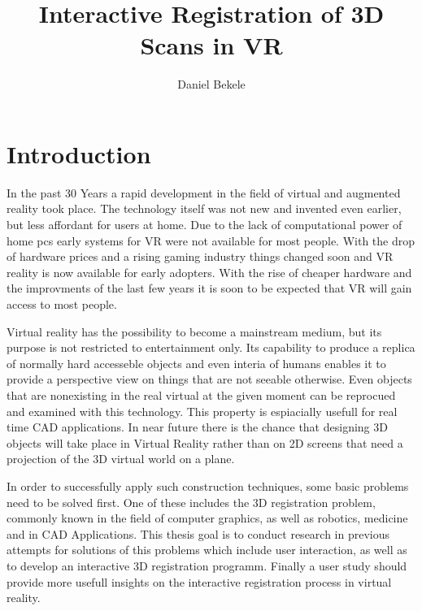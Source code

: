 \documentclass[hyperref,english,bachelorofscience,bibnum]{cgvpub}
\author{Daniel Bekele}
\title{Interactive Registration of 3D Scans in VR}
\begin{document}
\chapter{Introduction}
In the past 30 Years a rapid development in the field of  virtual and augmented reality took place. The technology itself was not new and invented even earlier, but less affordant for users at home. Due to the lack of computational power of home pcs early systems for VR were not available for most people. With the drop of hardware prices and a rising gaming industry things changed soon and VR reality is now available for early adopters. With the rise of cheaper hardware and the improvments of the last few years it is soon to be expected that VR will gain access to most people.

Virtual reality has the possibility to become a mainstream medium, but its purpose is not restricted to entertainment only. Its capability to produce a replica of normally hard accesseble objects and even interia of humans enables it to provide a perspective view on things that are not seeable otherwise. Even objects that are nonexisting in the real virtual at the given moment can be reprocued and examined with this technology. This property is espiacially usefull for real time CAD applications. In near future there is the chance that designing 3D objects will take place in Virtual Reality rather than on 2D screens that need a projection of the 3D virtual world on a plane.

In order to successfully apply such construction techniques, some basic problems need to be solved first. One of these includes the 3D registration problem, commonly known in the field of computer graphics, as well as robotics, medicine and in CAD Applications.
This thesis goal is to conduct research in previous attempts for solutions of this problems which include user interaction, as well as to develop an interactive 3D registration programm. Finally a user study should provide more usefull insights on the interactive registration process in virtual reality.
\end{document}
